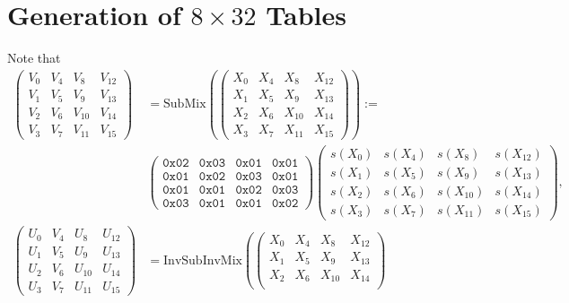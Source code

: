 \section{Generation of $8\times 32$ Tables}
Note that \begin{align*}
	\begin{pmatrix}
		V_0 & V_4 & V_8 & V_{12} \\
		V_1 & V_5 & V_9 & V_{13} \\
		V_2 & V_6 & V_{10} & V_{14} \\
		V_3 & V_7 & V_{11} & V_{15}
	\end{pmatrix}&=\text{SubMix}\left(\begin{pmatrix}
		X_0 & X_4 & X_8 & X_{12} \\
		X_1 & X_5 & X_9 & X_{13} \\
		X_2 & X_6 & X_{10} & X_{14} \\
		X_3 & X_7 & X_{11} & X_{15}
	\end{pmatrix}\right):=\\
&\begin{pmatrix}
		\texttt{0x02} & \texttt{0x03} & \texttt{0x01} & \texttt{0x01}\\
		\texttt{0x01} & \texttt{0x02} & \texttt{0x03} & \texttt{0x01}\\
		\texttt{0x01} & \texttt{0x01} & \texttt{0x02} & \texttt{0x03}\\
		\texttt{0x03} & \texttt{0x01} & \texttt{0x01} & \texttt{0x02}
	\end{pmatrix}\begin{pmatrix}
		s(X_0) & s(X_4) & s(X_8) & s(X_{12}) \\
		s(X_1) & s(X_5) & s(X_9) & s(X_{13}) \\
		s(X_2) & s(X_6) & s(X_{10}) & s(X_{14}) \\
		s(X_3) & s(X_7) & s(X_{11}) & s(X_{15})
	\end{pmatrix},\\
\begin{pmatrix}
	U_0 & V_4 & U_8 & U_{12} \\
	U_1 & V_5 & U_9 & U_{13} \\
	U_2 & V_6 & U_{10} & U_{14} \\
	U_3 & V_7 & U_{11} & U_{15}
\end{pmatrix}&=\text{InvSubInvMix}\left(\begin{pmatrix}
	X_0 & X_4 & X_8 & X_{12} \\
	X_1 & X_5 & X_9 & X_{13} \\
	X_2 & X_6 & X_{10} & X_{14} \\

\end{pmatrix}
\end{align*}
